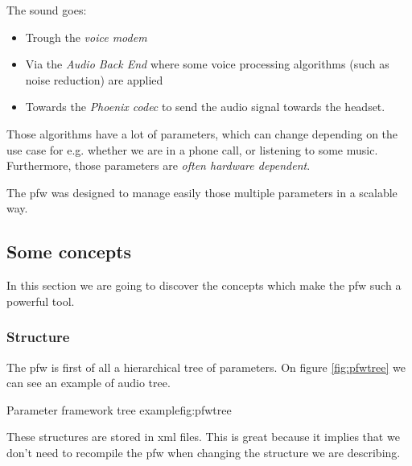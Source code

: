 The sound goes:
\begin{itemize}
    \item Trough the \emph{voice modem}
    \item Via the \emph{Audio Back End} where some voice processing algorithms (such as noise reduction) are applied
    \item Towards the \emph{Phoenix codec} to send the audio signal towards the headset.
\end{itemize}

Those algorithms have a lot of parameters, which can change depending on the use case for e.g. whether we are in a phone call,
or listening to some music. Furthermore, those parameters are \emph{often hardware dependent}.

The \gls{pfw} was designed to manage easily those multiple parameters in a scalable way.

\subsection{Some concepts}
In this section we are going to discover the concepts which make the
\gls{pfw} such a powerful tool.

\subsubsection{Structure}
The \gls{pfw} is first of all a hierarchical tree of parameters.
On figure \ref{fig:pfwtree} we can see an example of audio tree.

\begin{figureGraphics}{Parameter framework tree example}{fig:pfwtree}
\end{figureGraphics}

These structures are stored in \gls{xml} files. This is great because it implies that we don't need
to recompile the \gls{pfw} when changing the structure we are describing.

